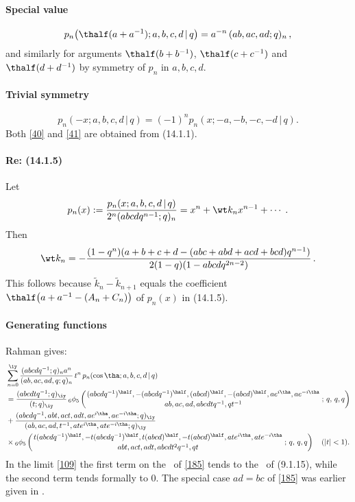 \documentclass[envcountchap,graybox]{svmono}
\newcounter{rom}
\newcommand{\qhyp}[5]{\mbox{}_{#1}{\phi}_{#2}
\left(\genfrac{}{}{0pt}{}{#3}{#4}\,;\,q,\,#5\right)}
\begin{document}
\paragraph{Special value}
\begin{equation}
p_n\big(\thalf(a+a^{-1});a,b,c,d\,|\, q\big)=a^{-n}\,(ab,ac,ad;q)_n\,,
\label{40}
\end{equation}
and similarly for arguments $\thalf(b+b^{-1})$, $\thalf(c+c^{-1})$ and
$\thalf(d+d^{-1})$ by symmetry of $p_n$ in $a,b,c,d$.
%
\paragraph{Trivial symmetry}
\begin{equation}
p_n(-x;a,b,c,d\,|\, q)=(-1)^n p_n(x;-a,-b,-c,-d\,|\, q).
\label{41}
\end{equation}
Both \eqref{40} and \eqref{41} are obtained from (14.1.1).
%
\paragraph{Re: (14.1.5)}
Let
\begin{equation}
p_n(x):=\frac{p_n(x;a,b,c,d\,|\, q)}{2^n(abcdq^{n-1};q)_n}=x^n+\wt k_n x^{n-1}
+\cdots\;.
\label{18}
\end{equation}
Then
\begin{equation}
\wt k_n=-\frac{(1-q^n)(a+b+c+d-(abc+abd+acd+bcd)q^{n-1})}
{2(1-q)(1-abcdq^{2n-2})}\,.
\label{19}
\end{equation}
This follows because $\tilde k_n-\tilde k_{n+1}$ equals the coefficient
$\thalf\bigl(a+a^{-1}-(A_n+C_n)\bigr)$ of $p_n(x)$ in (14.1.5).
%
\paragraph{Generating functions}
Rahman  gives:
\begin{align}
&\sum_{n=0}^\iy \frac{(abcdq^{-1};q)_n a^n}{(ab,ac,ad,q;q)_n}\,t^n\,
p_n(\cos\tha;a,b,c,d\,|\,q)
\nonumber\\
&=\frac{(abcdtq^{-1};q)_\iy}{(t;q)_\iy}\,
\qhyp65{(abcdq^{-1})^\half,-(abcdq^{-1})^\half,(abcd)^\half,
-(abcd)^\half,a e^{i\tha},a e^{-i\tha}}
{ab,ac,ad,abcdtq^{-1},qt^{-1}}{q,q}
\nonumber\\
&+\frac{(abcdq^{-1},abt,act,adt,ae^{i\tha},ae^{-i\tha};q)_\iy}
{(ab,ac,ad,t^{-1},ate^{i\tha},ate^{-i\tha};q)_\iy}
\nonumber\\
&\times\qhyp65{t(abcdq^{-1})^\half,-t(abcdq^{-1})^\half,t(abcd)^\half,
-t(abcd)^\half,at e^{i\tha},at e^{-i\tha}}
{abt,act,adt,abcdt^2q^{-1},qt}{q,q}\quad(|t|<1).
\label{185}
\end{align}
In the limit \eqref{109} the first term on the \RHS\ of \eqref{185}
tends to the \LHS\ of (9.1.15), while the second term tends formally
to 0. The special case $ad=bc$ of \eqref{185} was earlier given in
.
%
\end{document}
